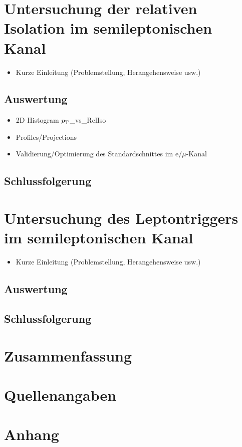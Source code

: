 \documentclass[12pt,a4paper]{article}
\newcommand{\pt}{$p_{\text T}$}
\begin{document}
\section{Untersuchung der relativen Isolation im semileptonischen Kanal}
\begin{itemize}
\item Kurze Einleitung (Problemstellung, Herangehensweise usw.)
\end{itemize}
\subsection{Auswertung}
\begin{itemize}
\item 2D Histogram \pt \_vs\_RelIso
\item Profiles/Projections
\item Validierung/Optimierung des Standardschnittes im e/$\mu$-Kanal
\end{itemize}
\subsection{Schlussfolgerung}
\section{Untersuchung des Leptontriggers im semileptonischen Kanal}
\begin{itemize}
\item Kurze Einleitung (Problemstellung, Herangehensweise usw.)
\end{itemize}
\subsection{Auswertung}
\subsection{Schlussfolgerung}
\section{Zusammenfassung}
\section{Quellenangaben}
\section{Anhang}
\newpage
\tableofcontents
\end{document}
